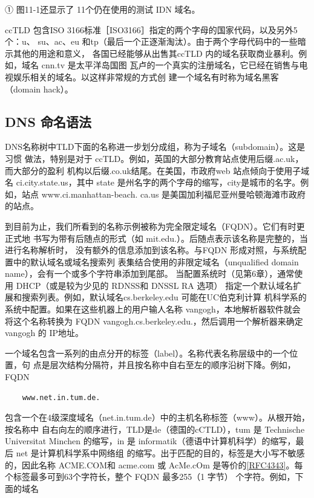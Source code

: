 ① 图11-1还显示了 11个仍在使用的测试 IDN 域名。

ccTLD 包含ISO 3166标准［ISO3166］指定的两个字母的国家代码，以及另外5个：u、
su、ac、eu 和tp（最后一个正逐渐淘汰）。由于两个字母代码中的一些暗示其他的用途和意义，
各国已经能够从出售其ccTLD 内的域名获取商业暴利。例如，域名 cnn.tv 是太平洋岛国图
瓦卢的一个真实的注册域名，它已经在销售与电视娱乐相关的域名。以这样非常规的方式创
建一个域名有时称为域名黑客（domain hack）。

\subsection{DNS 命名语法}

DNS名称树中TLD下面的名称进一步划分成组，称为子域名（subdomain）。这是习惯
做法，特别是对于 ccTLD。例如，英国的大部分教育站点使用后缀.ac.uk，而大部分的盈利
机构以后缀.co.uk结尾。在美国，市政府web 站点倾向于使用子域名 ci.city.state.us，其中
state 是州名字的两个字母的缩写，city是城市的名字。例如，站点 www.ci.manhattan-beach.
ca.us 是美国加利福尼亚州曼哈顿海滩市政府的站点。

到目前为止，我们所看到的名称示例被称为完全限定域名（FQDN）。它们有时更正式地
书写为带有后随点的形式（如 mit.edu.）。后随点表示该名称是完整的，当进行名称解析时，
没有额外的信息添加到该名称。与FQDN 形成对照，与系统配置中的默认域名或域名搜索列
表集结合使用的非限定域名（unqualified domain name），会有一个或多个字符串添加到尾部。
当配置系统时（见第6章），通常使用 DHCP（或是较为少见的 RDNSS和 DNSSL RA 选项）
指定一个默认域名扩展和搜索列表。例如，默认域名cs.berkeley.edu 可能在UC伯克利计算
机科学系的系统中配置。如果在这些机器上的用户输人名称 vangogh，本地解析器软件就会
将这个名称转换为 FQDN vangogh.cs.berkeley.edu.，然后调用一个解析器来确定 vangogh 的
IP地址。

一个域名包含一系列的由点分开的标签（label）。名称代表名称层级中的一个位置，句
点是层次结构分隔符，并且按名称中自右至左的顺序沿树下降。例如，FQDN

\begin{verbatim}
    www.net.in.tum.de.
\end{verbatim}

包含一个在4级深度域名（net.in.tum.de）中的主机名称标签（www）。从根开始，按名称中
自右向左的顺序进行，TLD是de（德国的cCTLD），tum 是 Technische Universitat Minchen
的缩写，in 是 informatik（德语中计算机科学）的缩写，最后 net 是计算机科学系中网络组
的缩写。出于匹配的目的，标签是大小写不敏感的，因此名称 ACME.COM和 acme.com 或
AcMe.cOm 是等价的\href{https://www.rfc-editor.org/rfc/rfc4343}{[RFC4343]}。每个标签最多可到63个字符长，整个 FQDN 最多255（1
字节） 个字符。例如，下面的域名

